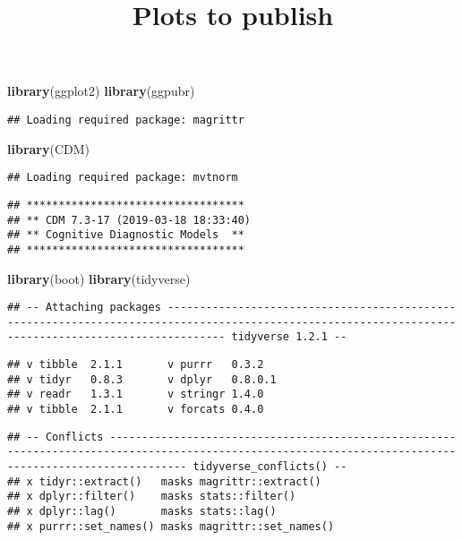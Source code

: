 \documentclass[]{article}
\title{Plots to publish}
\author{}
\date{}
\newenvironment{Shaded}{\begin{snugshade}}{\end{snugshade}}
\newcommand{\KeywordTok}[1]{\textcolor[rgb]{0.13,0.29,0.53}{\textbf{#1}}}
\newcommand{\NormalTok}[1]{#1}
\begin{document}
\maketitle

\begin{Shaded}
\begin{Highlighting}[]
\KeywordTok{library}\NormalTok{(ggplot2)}
\KeywordTok{library}\NormalTok{(ggpubr)}
\end{Highlighting}
\end{Shaded}

\begin{verbatim}
## Loading required package: magrittr
\end{verbatim}

\begin{Shaded}
\begin{Highlighting}[]
\KeywordTok{library}\NormalTok{(CDM)}
\end{Highlighting}
\end{Shaded}

\begin{verbatim}
## Loading required package: mvtnorm
\end{verbatim}

\begin{verbatim}
## **********************************
## ** CDM 7.3-17 (2019-03-18 18:33:40)      
## ** Cognitive Diagnostic Models  **
## **********************************
\end{verbatim}

\begin{Shaded}
\begin{Highlighting}[]
\KeywordTok{library}\NormalTok{(boot)}
\KeywordTok{library}\NormalTok{(tidyverse)}
\end{Highlighting}
\end{Shaded}

\begin{verbatim}
## -- Attaching packages ----------------------------------------------------------------------------------------------------------------------------------------------------- tidyverse 1.2.1 --
\end{verbatim}

\begin{verbatim}
## v tibble  2.1.1       v purrr   0.3.2  
## v tidyr   0.8.3       v dplyr   0.8.0.1
## v readr   1.3.1       v stringr 1.4.0  
## v tibble  2.1.1       v forcats 0.4.0
\end{verbatim}

\begin{verbatim}
## -- Conflicts -------------------------------------------------------------------------------------------------------------------------------------------------------- tidyverse_conflicts() --
## x tidyr::extract()   masks magrittr::extract()
## x dplyr::filter()    masks stats::filter()
## x dplyr::lag()       masks stats::lag()
## x purrr::set_names() masks magrittr::set_names()
\end{verbatim}
\end{document}
